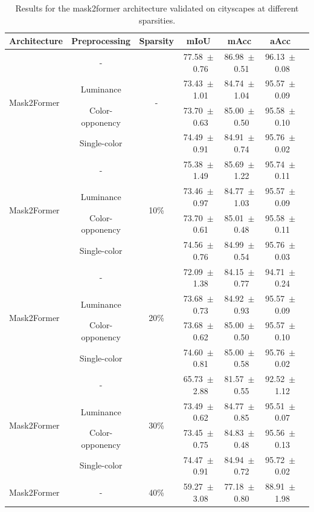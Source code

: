 \begin{table}[h]
\centering
\caption{Results for the mask2former architecture validated on cityscapes at different sparsities.}
\begin{tabular}{@{}lccc ccc@{}}
\toprule
Architecture & Preprocessing & Sparsity & mIoU & mAcc & aAcc \\
\midrule

\multirow{4}{*}{Mask2Former} & - & \multirow{4}{*}{-} & 77.58~$\pm$~0.76 & 86.98~$\pm$~0.51 & 96.13~$\pm$~0.08 \\
& Luminance & & 73.43~$\pm$~1.01 & 84.74~$\pm$~1.04 & 95.57~$\pm$~0.09 \\
& Color-opponency & & 73.70~$\pm$~0.63 & 85.00~$\pm$~0.50 & 95.58~$\pm$~0.10 \\
& Single-color & & 74.49~$\pm$~0.91 & 84.91~$\pm$~0.74 & 95.76~$\pm$~0.02 \\
\midrule
\multirow{4}{*}{Mask2Former} & - & \multirow{4}{*}{10\%} & 75.38~$\pm$~1.49 & 85.69~$\pm$~1.22 & 95.74~$\pm$~0.11 \\
& Luminance & & 73.46~$\pm$~0.97 & 84.77~$\pm$~1.03 & 95.57~$\pm$~0.09 \\
& Color-opponency & & 73.70~$\pm$~0.61 & 85.01~$\pm$~0.48 & 95.58~$\pm$~0.11 \\
& Single-color & & 74.56~$\pm$~0.76 & 84.99~$\pm$~0.54 & 95.76~$\pm$~0.03 \\
\midrule
\multirow{4}{*}{Mask2Former} & - & \multirow{4}{*}{20\%} & 72.09~$\pm$~1.38 & 84.15~$\pm$~0.77 & 94.71~$\pm$~0.24 \\
& Luminance & & 73.68~$\pm$~0.73 & 84.92~$\pm$~0.93 & 95.57~$\pm$~0.09 \\
& Color-opponency & & 73.68~$\pm$~0.62 & 85.00~$\pm$~0.50 & 95.57~$\pm$~0.10 \\
& Single-color & & 74.60~$\pm$~0.81 & 85.00~$\pm$~0.58 & 95.76~$\pm$~0.02 \\
\midrule
\multirow{4}{*}{Mask2Former} & - & \multirow{4}{*}{30\%} & 65.73~$\pm$~2.88 & 81.57~$\pm$~0.55 & 92.52~$\pm$~1.12 \\
& Luminance & & 73.49~$\pm$~0.62 & 84.77~$\pm$~0.85 & 95.51~$\pm$~0.07 \\
& Color-opponency & & 73.45~$\pm$~0.75 & 84.83~$\pm$~0.48 & 95.56~$\pm$~0.13 \\
& Single-color & & 74.47~$\pm$~0.91 & 84.94~$\pm$~0.72 & 95.72~$\pm$~0.02 \\
\midrule
\multirow{4}{*}{Mask2Former} & - & \multirow{4}{*}{40\%} & 59.27~$\pm$~3.08 & 77.18~$\pm$~0.80 & 88.91~$\pm$~1.98 \\

\end{tabular}
\end{table}
